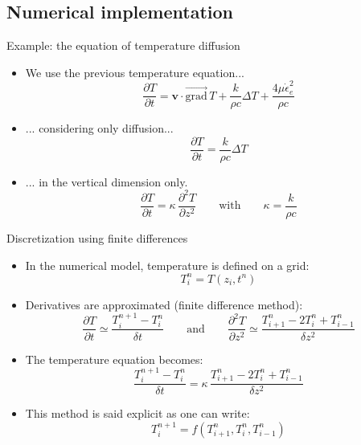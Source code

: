 \documentclass[aspectratio=1610]{beamer}
\begin{document}
\subsection{Numerical implementation}


    \begin{frame}{Example: the equation of temperature diffusion}
      \begin{itemize}[<+->]
        \item We use the previous temperature equation...
        $$\frac{\partial T}{\partial t}
          = \mathbf{v} \cdot \vec{\mathrm{grad}}\,T
          + \frac{k}{\rho c} \Delta T
          + \frac{4 \mu \dot \epsilon_e^2}{\rho c}$$
        \item ... considering only diffusion...
        $$\frac{\partial T}{\partial t}
         = \frac{k}{\rho c} \Delta T$$
        \item ... in the vertical dimension only.
        $$\frac{\partial T}{\partial t}
          = \kappa\,\frac{\partial^2 T}{\partial z^2}
          \qquad \mathrm{with} \qquad
          \kappa = \frac{k}{\rho c}$$
      \end{itemize}
    \end{frame}

    \begin{frame}{Discretization using finite differences}
      \begin{itemize}[<+->]
        \item In the numerical model, temperature is defined on a grid:
        $$T_i^n=T(z_i,t^n)$$
        \item Derivatives are approximated (\alert{finite difference method}):
        $$\frac{\partial T}{\partial t}\simeq\frac{T_i^{n+1}-T_i^n}{\delta t}
          \qquad \mathrm{and} \qquad
          \frac{\partial^2 T}{\partial z^2}\simeq
            \frac{T_{i+1}^n-2T_i^n+T_{i-1}^n}{\delta z^2}$$
        \item The temperature equation becomes:
        $$\frac{T_i^{n+1}-T_i^n}{\delta t}
        =\kappa\,\frac{T_{i+1}^n-2T_i^n+T_{i-1}^n}{\delta z^2}$$
        \item This method is said \alert{explicit} as one can write:
        $$T_i^{n+1} = f(T_{i+1}^n, T_i^n, T_{i-1}^n)$$
      \end{itemize}
    \end{frame}
\end{document}

